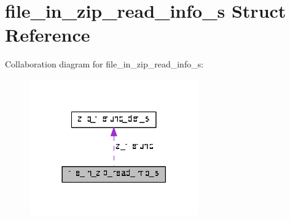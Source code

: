 \hypertarget{structfile__in__zip__read__info__s}{}\section{file\+\_\+in\+\_\+zip\+\_\+read\+\_\+info\+\_\+s Struct Reference}
\label{structfile__in__zip__read__info__s}


Collaboration diagram for file\+\_\+in\+\_\+zip\+\_\+read\+\_\+info\+\_\+s\+:\nopagebreak
\begin{figure}[H]
\begin{center}
\leavevmode
\includegraphics[width=206pt]{structfile__in__zip__read__info__s__coll__graph}
\end{center}
\end{figure}
